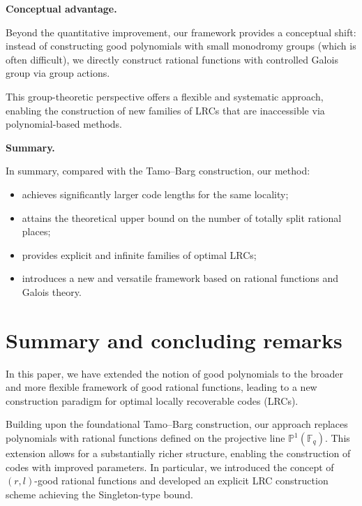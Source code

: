 \documentclass[1p,final]{elsarticle}
\newtheorem{open problem}[theorem]{Open Problem}
\begin{document}
\medskip

\noindent
\textbf{Conceptual advantage.}

Beyond the quantitative improvement, our framework provides a conceptual shift: instead of constructing good polynomials with small monodromy groups (which is often difficult), we directly construct rational functions with controlled Galois group via group actions.

\medskip

This group-theoretic perspective offers a flexible and systematic approach, enabling the construction of new families of LRCs that are inaccessible via polynomial-based methods.

\medskip

\noindent
\textbf{Summary.}

In summary, compared with the Tamo--Barg construction, our method:
\begin{itemize}
\item achieves significantly larger code lengths for the same locality;
\item attains the theoretical upper bound on the number of totally split rational places;
\item provides explicit and infinite families of optimal LRCs;
\item introduces a new and versatile framework based on rational functions and Galois theory.
\end{itemize}





\section{Summary and concluding remarks}\label{summary}

In this paper, we have extended the notion of good polynomials to the broader and more flexible framework of good rational functions, leading to a new construction paradigm for optimal locally recoverable codes (LRCs). 

\medskip

Building upon the foundational Tamo--Barg construction, our approach replaces polynomials with rational functions defined on the projective line $\mathbb{P}^1(\mathbb{F}_q)$. This extension allows for a substantially richer structure, enabling the construction of codes with improved parameters. In particular, we introduced the concept of $(r,l)$-good rational functions and developed an explicit LRC construction scheme achieving the Singleton-type bound.
\end{document}
